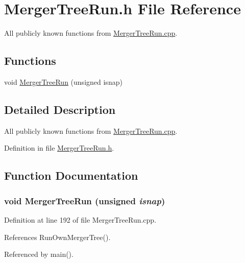 \section{MergerTreeRun.h File Reference}
\label{MergerTreeRun_8h}


All publicly known functions from \hyperlink{MergerTreeRun_8cpp}{MergerTreeRun.cpp}.  


\subsection*{Functions}
\begin{DoxyCompactItemize}
\item 
void \hyperlink{MergerTreeRun_8h_a7fd5b46e681f15aaa5ca850f51d1fee4}{MergerTreeRun} (unsigned isnap)
\end{DoxyCompactItemize}


\subsection{Detailed Description}
All publicly known functions from \hyperlink{MergerTreeRun_8cpp}{MergerTreeRun.cpp}. 

Definition in file \hyperlink{MergerTreeRun_8h_source}{MergerTreeRun.h}.



\subsection{Function Documentation}
\subsubsection[{MergerTreeRun}]{\setlength{\rightskip}{0pt plus 5cm}void MergerTreeRun (unsigned {\em isnap})}\label{MergerTreeRun_8h_a7fd5b46e681f15aaa5ca850f51d1fee4}


Definition at line 192 of file MergerTreeRun.cpp.



References RunOwnMergerTree().



Referenced by main().

